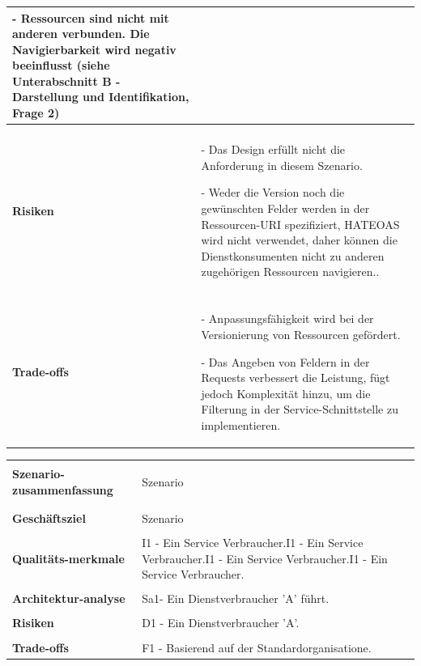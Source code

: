 \documentclass{acmsiggraph}
\begin{document}
\begin{center}
\begin{xtabular}{|C{2,5cm}|L{5,5cm}|}
\item[-] Ressourcen sind nicht mit anderen verbunden. Die Navigierbarkeit wird negativ beeinflusst (siehe Unterabschnitt B - Darstellung und Identifikation, Frage 2)
 \\ 
     \hline 
     & \\[-2ex]
   \textbf{Risiken} & 
 \item[-]Das Design erfüllt nicht die Anforderung in diesem Szenario.
 \item[-]Weder die Version noch die gewünschten Felder werden in der Ressourcen-URI spezifiziert, HATEOAS wird nicht verwendet, daher können die Dienstkonsumenten nicht zu anderen zugehörigen Ressourcen navigieren..
 \\ 
       \hline 
      & \\[-2ex]
     \textbf{Trade-offs} & 
\item[-]  Anpassungsfähigkeit wird bei der Versionierung von Ressourcen gefördert.
\item[-] Das Angeben von Feldern in der Requests verbessert die Leistung, fügt jedoch Komplexität hinzu, um die Filterung in der Service-Schnittstelle zu implementieren.
\\    
\hline 
 \end{xtabular}
 \end{center}
 
 \vspace{4px}
\begin{center}
  \label{tab:xtab}
  \begin{xtabular}{|C{2,5cm}|L{5,5cm}|} 
  \hline
  & \\[-2ex]
    \textbf{Szenario-zusammenfassung} & Szenario \\
    & \\[-2ex]
  \hline
  & \\[-2ex]
    \textbf{Geschäftsziel} & Szenario \\
    \hline
    & \\[-2ex]
   \textbf{ Qualitäts-merkmale } & I1 - Ein  Service Verbraucher.I1 - Ein  Service Verbraucher.I1 - Ein  Service Verbraucher.I1 - Ein  Service Verbraucher.
 \\ 
     \hline
       & \\[-2ex]
    \textbf{Architektur-analyse} & 
     Sa1- Ein Dienstverbraucher 'A' führt.
 \\ 
     \hline 
     & \\[-2ex]
   \textbf{Risiken} & 
     D1 - Ein Dienstverbraucher 'A'.
 \\ 
       \hline 
      & \\[-2ex]
     \textbf{Trade-offs} & 
     F1 - Basierend auf der Standardorganisatione.
\\    
\hline 
 \end{xtabular}
 \end{center}
\end{document}
